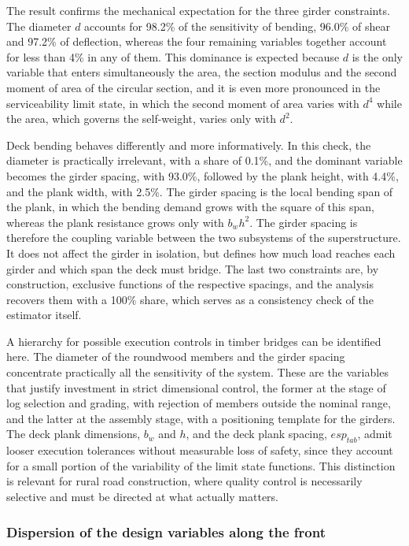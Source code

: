 The result confirms the mechanical expectation for the three girder constraints.
The diameter $d$ accounts for 98.2\% of the sensitivity of bending, 96.0\% of shear and 97.2\% of deflection, whereas the four remaining variables together account for less than 4\% in any of them.
This dominance is expected because $d$ is the only variable that enters simultaneously the area, the section modulus and the second moment of area of the circular section, and it is even more pronounced in the serviceability limit state, in which the second moment of area varies with $d^4$ while the area, which governs the self-weight, varies only with $d^2$.

Deck bending behaves differently and more informatively.
In this check, the diameter is practically irrelevant, with a share of 0.1\%, and the dominant variable becomes the girder spacing, with 93.0\%, followed by the plank height, with 4.4\%, and the plank width, with 2.5\%.
The girder spacing is the local bending span of the plank, in which the bending demand grows with the square of this span, whereas the plank resistance grows only with $b_w h^2$.
The girder spacing is therefore the coupling variable between the two subsystems of the superstructure. It does not affect the girder in isolation, but defines how much load reaches each girder and which span the deck must bridge.
The last two constraints are, by construction, exclusive functions of the respective spacings, and the analysis recovers them with a 100\% share, which serves as a consistency check of the estimator itself.

A hierarchy for possible execution controls in timber bridges can be identified here.
The diameter of the roundwood members and the girder spacing concentrate practically all the sensitivity of the system.
These are the variables that justify investment in strict dimensional control, the former at the stage of log selection and grading, with rejection of members outside the nominal range, and the latter at the assembly stage, with a positioning template for the girders.
The deck plank dimensions, $b_w$ and $h$, and the deck plank spacing, $esp_{tab}$, admit looser execution tolerances without measurable loss of safety, since they account for a small portion of the variability of the limit state functions.
This distinction is relevant for rural road construction, where quality control is necessarily selective and must be directed at what actually matters.

\subsubsection{Dispersion of the design variables along the front}\label{sec:dispersao}

